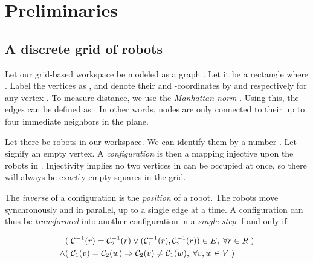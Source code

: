 \section{Preliminaries}

\subsection{A discrete grid of robots}

Let our grid-based workspace be modeled as a graph . Let it be a rectangle  where . Label the vertices as , and denote their  and  -coordinates by  and  respectively for any vertex . To measure distance, we use the \emph{Manhattan norm} . Using this, the edges can be defined as . In other words, nodes are only connected to their up to four immediate neighbors in the plane.

Let there be  robots in our workspace. We can identify them by a number . Let \ilmath{\bot} signify an empty vertex. A \emph{configuration} is then a mapping  injective upon the robots in . Injectivity implies no two vertices in  can be occupied at once, so there will always be exactly  empty squares in the grid.

The \emph{inverse} of a configuration  is the \emph{position} of a robot. The robots move synchronously and in parallel, up to a single edge at a time. A configuration  can thus be \emph{transformed} into another configuration  in a \emph{single step} if and only if:

\begin{align}
	& (\; \mathcal{C}_{1}^{-1}(r) = \mathcal{C}_{2}^{-1}(r) \lor (\mathcal{C}_{1}^{-1}(r), \mathcal{C}_{2}^{-1}(r)) \in E, \; \forall r \in R \;)\label{req:limited_movement}\\
	\land & (\; \mathcal{C}_{1}(v) = \mathcal{C}_{2}(w) \Rightarrow \mathcal{C}_{2}(v) \neq \mathcal{C}_{1}(w), \; \forall v, w \in V \;)\label{req:no_swaps}
\end{align}

